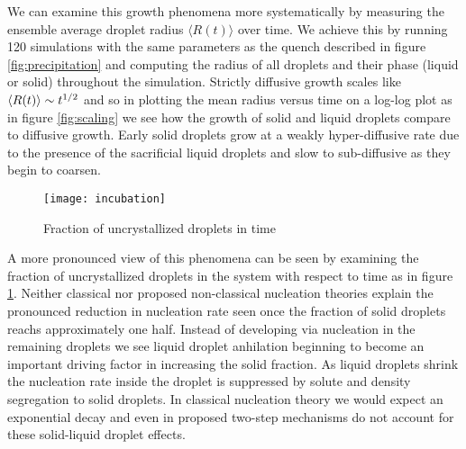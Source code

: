 We can examine this growth phenomena more systematically by measuring the
ensemble average droplet radius $\langle R(t) \rangle$ over time. We achieve
this by running 120 simulations with the same parameters as the quench
described in figure \ref{fig:precipitation} and computing the radius of all
droplets and their phase (liquid or solid) throughout the simulation. Strictly
diffusive growth scales like $\left\langle R(t) \right\rangle \sim t^{1/2}$ and so in plotting the
mean radius versus time on a log-log plot as in figure \ref{fig:scaling} we see
how the growth of solid and liquid droplets compare to diffusive growth. Early
solid droplets grow at a weakly hyper-diffusive rate due to the presence of
the sacrificial liquid droplets and slow to sub-diffusive as they begin to
coarsen.

\begin{figure}
    \centering
    \texttt{[image: incubation]}
    \caption[Fraction of uncrystallized droplets in time]{
        \label{fig:incubation}
        Fraction of uncrystallized droplets in time
    }
\end{figure}

A more pronounced view of this phenomena can be seen by examining the fraction
of uncrystallized droplets in the system with respect to time as in figure
\ref{fig:incubation}. Neither classical nor proposed non-classical nucleation
theories explain the pronounced reduction in nucleation rate seen once the
fraction of solid droplets reachs approximately one half. Instead of developing
via nucleation in the remaining droplets we see liquid droplet anhilation
beginning to become an important driving factor in increasing the solid
fraction. As liquid droplets shrink the nucleation rate inside the droplet is
suppressed by solute and density segregation to solid droplets. In classical
nucleation theory we would expect an exponential decay and even in proposed
two-step mechanisms do not account for these solid-liquid droplet effects\cite{MYERSON04, MYERSON09}.



